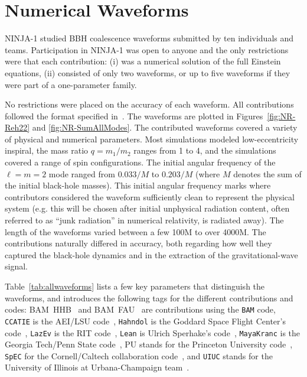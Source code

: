 
\section{Numerical Waveforms}
\label{sec:ninja1_nrwaveforms}

NINJA-1 studied BBH coalescence waveforms submitted by ten individuals
and teams.  Participation in NINJA-1 was open to anyone and the only
restrictions were that each contribution: (i) was a numerical solution
of the full Einstein equations, (ii) consisted of only two waveforms,
or up to five waveforms if they were part of a one-parameter family.

No restrictions were placed on the accuracy of each waveform. All
contributions followed the format specified in~\cite{Brown:2007jx}.
The waveforms are plotted in Figures~\ref{fig:NR-Reh22} and
\ref{fig:NR-SumAllModes}.
%
The contributed waveforms covered a variety of physical and numerical
parameters. Most simulations modeled low-eccentricity inspiral, the mass
ratio $q = m_1/m_2$ ranges from 1 to 4, and the simulations covered a
range of spin configurations.  The initial angular frequency of the
$\ell=m=2$ mode ranged from $0.033/M$ to $0.203/M$ (where $M$ denotes
the sum of the initial black-hole masses). This initial angular
frequency marks where contributors considered the waveform sufficiently
clean to represent the physical system (e.g. this will be chosen after
initial unphysical radiation content, often referred to as ``junk
radiation'' in numerical relativity, is radiated away).   The length
of the waveforms varied between a few 100M to over 4000M.  The
contributions naturally differed in accuracy, both regarding how well
they captured the black-hole dynamics and in the extraction of the
gravitational-wave signal. 

Table~\ref{tab:allwaveforms} lists a few key parameters that
distinguish the waveforms, and introduces the following tags for the
different contributions and codes:
%
%
BAM~HHB~\cite{Brugmann:2008zz,Husa:2007hp,Hannam:2007ik,Hannam:2007wf,Bruegmann:2003aw} 
and BAM~FAU~\cite{Brugmann:2008zz,Husa:2007hp,Tichy:2008du,Bruegmann:2003aw}
are contributions using the {\tt BAM} code,
{\tt CCATIE} is the AEI/LSU code~\cite{Alcubierre:2000xu,Alcubierre:2002kk,Koppitz:2007ev,Pollney:2007ss,Rezzolla:2007xa},
{\tt Hahndol} is the Goddard Space Flight Center's code~\cite{Imbiriba:2004tp,vanMeter:2006vi}, 
{\tt LazEv} is the RIT code~\cite{Zlochower:2005bj,Campanelli:2005dd,Dain:2008ck}, 
{\tt Lean} is Ulrich Sperhake's code~\cite{Sperhake:2006cy,Sperhake:2007gu, Sperhake2008},
{\tt MayaKranc} is the Georgia Tech/Penn State code~\cite{Vaishnav:2007nm,Hinder:2007qu}, 
PU stands for the Princeton University code~\cite{Pretorius:2004jg,Pretorius:2005gq,Buonanno:2006ui,Pretorius:2007jn},
{\tt SpEC} for the Cornell/Caltech collaboration 
code~\cite{Scheel:2006gg,Pfeiffer:2007yz,Boyle:2007ft,Scheel:2008rj},
and
{\tt UIUC} stands for the University of Illinois at
Urbana-Champaign team~\cite{Etienne:2007hr}.


